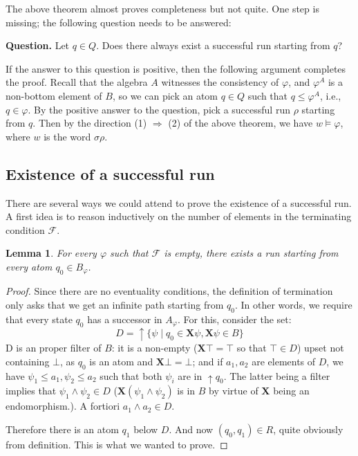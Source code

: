 \documentclass{article}
\newcommand{\X}{\mathbf{X}}
\newcommand{\cF}{\mathcal{F}}
\renewcommand{\phi}{\varphi}
\newtheorem{lemma}[theorem]{Lemma}
\begin{document}
The above theorem almost proves completeness but not quite. One step is missing;
the following question needs to be answered:

{\bf Question.} Let $q \in Q$. Does there always exist a successful run starting
from $q$?

If the answer to this question is positive, then the following argument
completes the proof. Recall that the algebra $A$ witnesses the consistency of
$\phi$, and $\phi^A$ is a non-bottom element of $B$, so we can pick an atom $q
\in Q$ such that $q \leq \phi^A$, i.e., $q \in \phi$. By the positive answer to
the question, pick a successful run $\rho$ starting from $q$. Then by the
direction (1) $\Rightarrow$ (2) of the above theorem, we have $w \models \phi$,
where $w$ is the word $\sigma \rho$.

\subsection*{Existence of a successful run}
 There are several ways we could attend to prove the existence of a successful run. A first idea is to reason inductively on the number of
 elements in the terminating condition $\cF$.

 \begin{lemma}
	 For every $\phi$ such that $\cF$ is empty, there exists a run starting from every atom $q_0 \in B_\phi$. 
 \end{lemma}
 \begin{proof}
	 Since there are no eventuality conditions, the definition of termination only asks that we get an infinite path starting from $q_0$.
	 In other words, we require that every state $q_0$ has a successor in $A_\phi$. For this, consider the set:
	 \[D= \uparrow\{\psi\mid q_0\in\X\psi, \X\psi\in B\}\]
	 D is an proper filter of $B$: it is a non-empty ($\X\top=\top$ so that $\top\in D$) upset not containing $\bot$, as $q_0$ is an atom
	 and $\X\bot=\bot$;
	 and if $a_1, a_2$ are elements of $D$, we have $\psi_1\leq a_1, \psi_2\leq a_2$ such that both $\psi_i$ are in $\uparrow q_0$.
	 The latter being a filter implies that $\psi_1\wedge\psi_2 \in D$ ($\X(\psi_1\wedge\psi_2)$ is in $B$ by virtue of $\X$ being 
	 an endomorphism.). A fortiori $a_1\wedge a_2 \in D$.

	Therefore there is an atom $q_1$ below $D$. And now $(q_0,q_1)\in R$, quite obviously from definition. This is what we wanted to prove.
 \end{proof}
\end{document}
